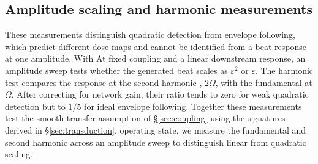 \documentclass[11pt,a4paper]{article}
\providecommand{\DIFaddtex}[1]{{\protect\color{blue} \sf #1}} %
\providecommand{\DIFdeltex}[1]{{\protect\color{red} \scriptsize #1}} %
\providecommand{\DIFaddbegin}{} %
\providecommand{\DIFaddend}{} %
\providecommand{\DIFdelbegin}{} %
\providecommand{\DIFdelend}{} %
\providecommand{\DIFadd}[1]{\texorpdfstring{\DIFaddtex{#1}}{#1}} %
\providecommand{\DIFdel}[1]{\texorpdfstring{\DIFdeltex{#1}}{}} %
\begin{document}
\subsection{Amplitude scaling and harmonic measurements}\label{sec:transduction-methods}
\DIFdelbegin \DIFdel{These measurements distinguish quadratic detection from envelope following,
which predict different dose maps and cannot be identified from a beat response
at one amplitude. With }\DIFdelend \DIFaddbegin \DIFadd{At }\DIFaddend fixed coupling and \DIFdelbegin \DIFdel{a linear downstream response, an
amplitude sweep tests whether the generated beat scales as $\varepsilon^2$ or
$\varepsilon$. The harmonic test compares the response at the second
harmonic ,
$2\Omega$, with the fundamental at $\Omega$. After correcting for network gain,
their ratio tends to zero for weak quadratic detection but to $1/5$ for ideal envelope following.
Together these
measurements test the smooth-transfer assumption of \S\ref{sec:coupling}
using the signatures derived in \S\ref{sec:transduction}.
}\DIFdelend \DIFaddbegin \DIFadd{operating state, we measure the fundamental and second
harmonic across an amplitude sweep to distinguish linear from quadratic scaling.
}\DIFaddend
\end{document}
